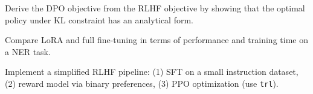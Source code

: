 \begin{exercise}[$\star\star$]
Derive the DPO objective from the RLHF objective by showing that the optimal
policy under KL constraint has an analytical form.
\end{exercise}

\begin{exercise}[$\star\star$]
Compare LoRA and full fine-tuning in terms of performance and training time on
a NER task.
\end{exercise}

\begin{exercise}[$\star\star\star$]
Implement a simplified RLHF pipeline: (1) SFT on a small instruction dataset,
(2) reward model via binary preferences, (3) PPO optimization (use
\texttt{trl}).
\end{exercise}
